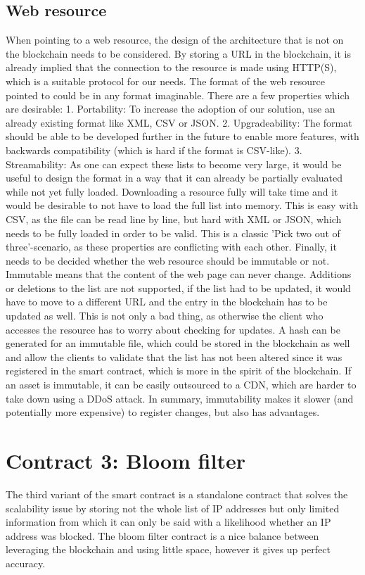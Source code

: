 \subsection{Web resource}
When pointing to a web resource, the design of the architecture that is not on the blockchain needs to be considered. By storing a URL in the blockchain, it is already implied that the connection to the resource is made using HTTP(S), which is a suitable protocol for our needs. The format of the web resource pointed to could be in any format imaginable. There are a few properties which are desirable: 1. Portability: To increase the adoption of our solution, use an already existing format like XML, CSV or JSON. 2. Upgradeability: The format should be able to be developed further in the future to enable more features, with backwards compatibility (which is hard if the format is CSV-like). 3. Streamability: As one can expect these lists to become very large, it would be useful to design the format in a way that it can already be partially evaluated while not yet fully loaded. Downloading a resource fully will take time and it would be desirable to not have to load the full list into memory. This is easy with CSV, as the file can be read line by line, but hard with XML or JSON, which needs to be fully loaded in order to be valid.
This is a classic 'Pick two out of three'-scenario, as these properties are conflicting with each other.
Finally, it needs to be decided whether the web resource should be immutable or not. Immutable means that the content of the web page can never change. Additions or deletions to the list are not supported, if the list had to be updated, it would have to move to a different URL and the entry in the blockchain has to be updated as well. This is not only a bad thing, as otherwise the client who accesses the resource has to worry about checking for updates. A hash can be generated for an immutable file, which could be stored in the blockchain as well and allow the clients to validate that the list has not been altered since it was registered in the smart contract, which is more in the spirit of the blockchain. If an asset is immutable, it can be easily outsourced to a CDN, which are harder to take down using a DDoS attack.
In summary, immutability makes it slower (and potentially more expensive) to register changes, but also has advantages.

\section{Contract 3: Bloom filter}
The third variant of the smart contract is a standalone contract that solves the scalability issue by storing not the whole list of IP addresses but only limited information from which it can only be said with a likelihood whether an IP address was blocked. The bloom filter contract is a nice balance between leveraging the blockchain and using little space, however it gives up perfect accuracy.

